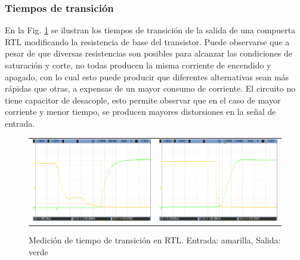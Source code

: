 \subsubsection{Tiempos de transici\'on}
En la Fig. \ref{fig:rtl_fixed} se ilustran los tiempos de transici\'on de la salida de una compuerta RTL modificando la resistencia de base del transistor.
Puede observarse que a pesar de que diversas resistencias son posibles para alcanzar las condiciones de saturaci\'on y corte, no todas producen la misma corriente de encendido y apagado,
con lo cual esto puede producir que diferentes alternativas sean m\'as r\'apidas que otras, a expensas de un mayor consumo de corriente. El circuito no tiene capacitor de desacople, esto permite
observar que en el caso de mayor corriente y menor tiempo, se producen mayores distorsiones en la se\~nal de entrada.

\begin{figure}[H]
    \centering
        \begin{tabular}{c c}
            \includegraphics[scale=0.2]{../EJ1/Mediciones/Osciloscopio/Observaciones/Mejora_polarizacion_RTL/cropped_scope_20.png} &
            \includegraphics[scale=0.2]{../EJ1/Mediciones/Osciloscopio/Observaciones/Mejora_polarizacion_RTL/cropped_scope_21.png}
        \end{tabular}
    \caption{Medici\'on de tiempo de transici\'on en RTL. Entrada: amarilla, Salida: verde}
    \label{fig:rtl_fixed}
\end{figure}

